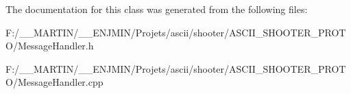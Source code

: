The documentation for this class was generated from the following files\+:\begin{DoxyCompactItemize}
\item 
F\+:/\+\_\+\+\_\+\+M\+A\+R\+T\+I\+N/\+\_\+\+\_\+\+E\+N\+J\+M\+I\+N/\+Projets/ascii/shooter/\+A\+S\+C\+I\+I\+\_\+\+S\+H\+O\+O\+T\+E\+R\+\_\+\+P\+R\+O\+T\+O/Message\+Handler.\+h\item 
F\+:/\+\_\+\+\_\+\+M\+A\+R\+T\+I\+N/\+\_\+\+\_\+\+E\+N\+J\+M\+I\+N/\+Projets/ascii/shooter/\+A\+S\+C\+I\+I\+\_\+\+S\+H\+O\+O\+T\+E\+R\+\_\+\+P\+R\+O\+T\+O/Message\+Handler.\+cpp\end{DoxyCompactItemize}
